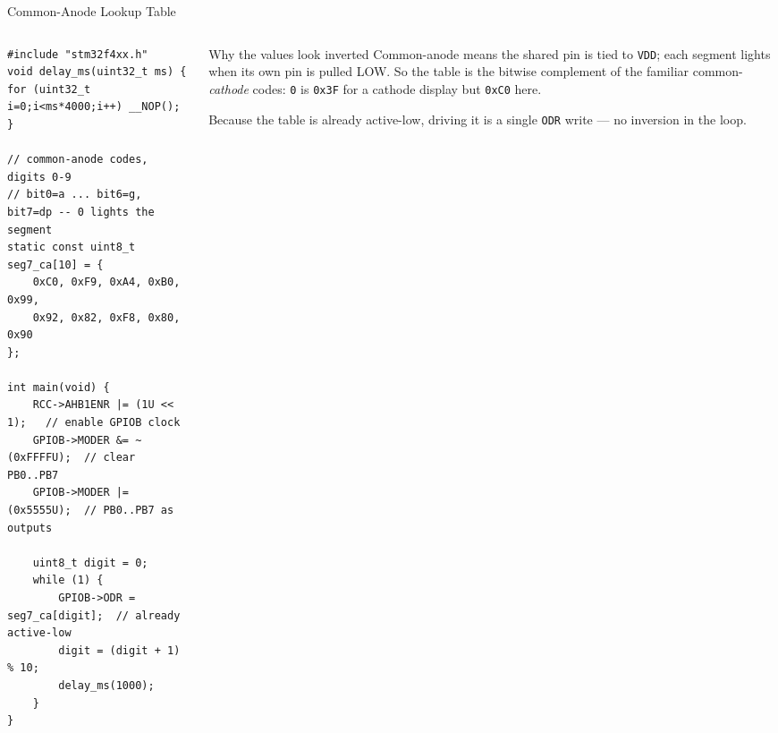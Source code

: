 \documentclass[9pt,aspectratio=169,xcolor=table]{beamer}
\begin{document}
\begin{frame}[fragile]{Common-Anode Lookup Table}
    \begin{columns}[T]
    \begin{column}{.56\textwidth}
\begin{lstlisting}[style=myc, basicstyle=\ttfamily\scriptsize]
#include "stm32f4xx.h"
void delay_ms(uint32_t ms) { for (uint32_t i=0;i<ms*4000;i++) __NOP(); }

// common-anode codes, digits 0-9
// bit0=a ... bit6=g, bit7=dp -- 0 lights the segment
static const uint8_t seg7_ca[10] = {
    0xC0, 0xF9, 0xA4, 0xB0, 0x99,
    0x92, 0x82, 0xF8, 0x80, 0x90
};

int main(void) {
    RCC->AHB1ENR |= (1U << 1);   // enable GPIOB clock
    GPIOB->MODER &= ~(0xFFFFU);  // clear PB0..PB7
    GPIOB->MODER |=  (0x5555U);  // PB0..PB7 as outputs

    uint8_t digit = 0;
    while (1) {
        GPIOB->ODR = seg7_ca[digit];  // already active-low
        digit = (digit + 1) % 10;
        delay_ms(1000);
    }
}
\end{lstlisting}
    \end{column}
    \begin{column}{.40\textwidth}
        \begin{block}{Why the values look inverted}
            \alert{Common-anode} means the shared pin is tied to
            \texttt{VDD}; each segment lights when its own pin is
            pulled \alert{LOW}. So the table is the bitwise complement
            of the familiar common-\emph{cathode} codes: \texttt{0} is
            \texttt{0x3F} for a cathode display but \texttt{0xC0} here.

            \vspace{1mm}
            Because the table is already active-low, driving it is a
            single \texttt{ODR} write --- no inversion in the loop.
        \end{block}
    \end{column}
    \end{columns}
\end{frame}
\end{document}

